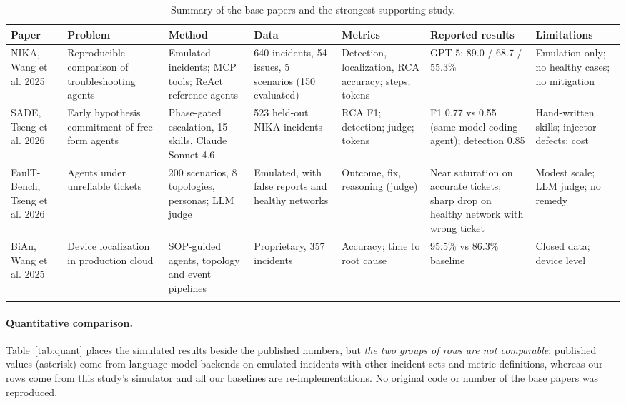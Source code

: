 \documentclass[pdflatex,sn-basic,Numbered,iicol]{sn-jnl}
\begin{document}
\begin{table}[t]
\caption{Summary of the base papers and the strongest supporting study.}\label{tab:basesum}
\scriptsize
\begin{tabular}{@{}L{1.7cm}L{2.0cm}L{2.2cm}L{2.1cm}L{1.7cm}L{2.3cm}L{1.9cm}@{}}
\toprule
Paper & Problem & Method & Data & Metrics & Reported results & Limitations \\
\midrule
NIKA, Wang et al. 2025~\cite{wang2025nika} & Reproducible comparison of troubleshooting agents & Emulated incidents; MCP tools; ReAct reference agents & 640 incidents, 54 issues, 5 scenarios (150 evaluated) & Detection, localization, RCA accuracy; steps; tokens & GPT-5: 89.0 / 68.7 / 55.3\% & Emulation only; no healthy cases; no mitigation \\
SADE, Tseng et al. 2026~\cite{tseng2026sade} & Early hypothesis commitment of free-form agents & Phase-gated escalation, 15 skills, Claude Sonnet 4.6 & 523 held-out NIKA incidents & RCA F1; detection; judge; tokens & F1 0.77 vs 0.55 (same-model coding agent); detection 0.85 & Hand-written skills; injector defects; cost \\
FaulT-Bench, Tseng et al. 2026~\cite{tseng2026faultbench} & Agents under unreliable tickets & 200 scenarios, 8 topologies, personas; LLM judge & Emulated, with false reports and healthy networks & Outcome, fix, reasoning (judge) & Near saturation on accurate tickets; sharp drop on healthy network with wrong ticket & Modest scale; LLM judge; no remedy \\
BiAn, Wang et al. 2025~\cite{wang2025bian} & Device localization in production cloud & SOP-guided agents, topology and event pipelines & Proprietary, 357 incidents & Accuracy; time to root cause & 95.5\% vs 86.3\% baseline & Closed data; device level \\
\botrule
\end{tabular}
\end{table}

\paragraph{Quantitative comparison.} Table~\ref{tab:quant} places the simulated results beside the published numbers, but \emph{the two groups of rows are not comparable}: published values (asterisk) come from language-model backends on emulated incidents with other incident sets and metric definitions, whereas our rows come from this study's simulator and all our baselines are re-implementations. No original code or number of the base papers was reproduced.
\end{document}
